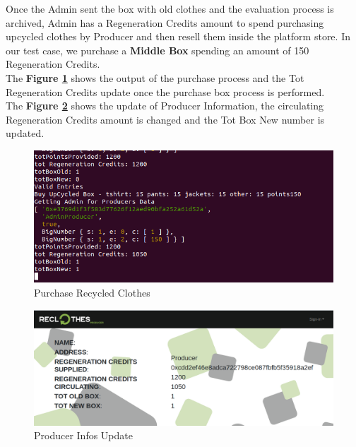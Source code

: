 Once the Admin sent the box with old clothes and the evaluation process is archived, Admin has a 
Regeneration Credits amount to spend purchasing upcycled clothes by Producer and then resell them
inside the platform store. In our test case, we purchase a \textbf{Middle Box} spending an amount 
of 150 Regeneration Credits.
\\
The \textbf{Figure \ref{fig:buy-recycled-clothes}} shows the output of the purchase process and the 
Tot Regeneration Credits update once the purchase box process is performed.
\\
The \textbf{Figure \ref{fig:producer-infos}} shows the update of Producer Information,
the circulating Regeneration Credits amount is changed and the Tot Box New number is updated.

\begin{figure}[h!]
	\centering
    \includegraphics[totalheight=5cm]{img/test/usecase2/4-buy-recycled-clothes.png}
	\caption{Purchase Recycled Clothes}
	\label{fig:buy-recycled-clothes}
\end{figure}

\begin{figure}[h!]
	\centering
    \includegraphics[totalheight=5cm]{img/test/usecase2/5-producer-info-update.png}
	\caption{Producer Infos Update}
	\label{fig:producer-infos}
\end{figure}